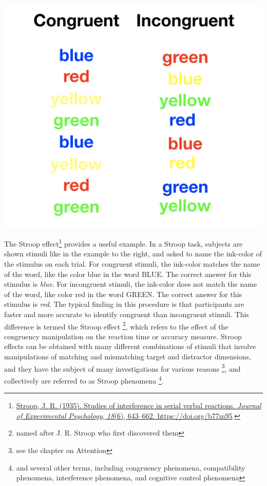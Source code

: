 \documentclass[
  oneside,
  12pt]{crumpbook}
\newenvironment{floatright50}{%
  \wrapfigure{R}{.5\textwidth}%
  }{%
  \endwrapfigure}
\begin{document}
\begin{floatright50}
\includegraphics[width=1\linewidth]{imgs/Stroop_stim}

\end{floatright50}

The Stroop effect\footnote{\protect\hyperlink{ref-Stroop1935}{Stroop, J. R. (1935). Studies of interference in serial verbal reactions. \emph{Journal of Experimental Psychology}, \emph{18}(6), 643--662. \url{https://doi.org/b77m95}}.} provides a useful example. In a Stroop task, subjects are shown stimuli like in the example to the right, and asked to name the ink-color of the stimulus on each trial. For congruent stimuli, the ink-color matches the name of the word, like the color blue in the word BLUE. The correct answer for this stimulus is \emph{blue}. For incongruent stimuli, the ink-color does not match the name of the word, like color red in the word GREEN. The correct answer for this stimulus is \emph{red}. The typical finding in this procedure is that participants are faster and more accurate to identify congruent than incongruent stimuli. This difference is termed the Stroop effect \footnote{named after J. R. Stroop who first discovered them}, which refers to the effect of the congruency manipulation on the reaction time or accuracy measure. Stroop effects can be obtained with many different combinations of stimuli that involve manipulations of matching and mismatching target and distractor dimensions, and they have the subject of many investigations for various reasons \footnote{see the chapter on Attention}, and collectively are referred to as Stroop phenomena \footnote{and several other terms, including congruency phenomena, compatibility phenomena, interference phenomena, and cognitive control phenomena}.
\end{document}
